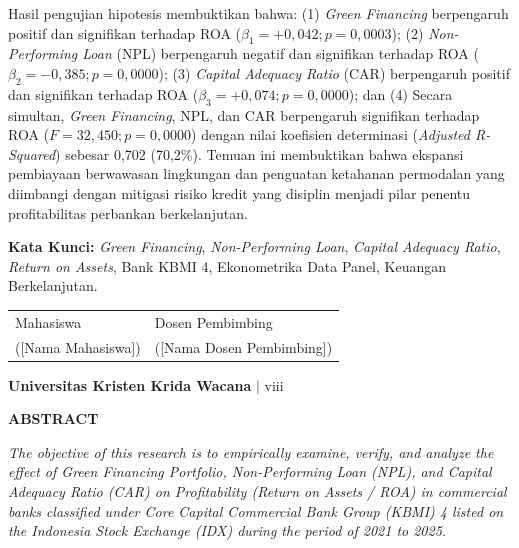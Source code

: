 \documentclass[12pt,a4paper]{article}
\newcommand{\ukrida}{Universitas Kristen Krida Wacana}
\newcommand{\nahamahasiswa}{[Nama Mahasiswa]}
\newcommand{\dosbim}{[Nama Dosen Pembimbing]}
\numberwithin{equation}{section}
\begin{document}
\noindent
Hasil pengujian hipotesis membuktikan bahwa: (1) \emph{Green Financing} berpengaruh positif dan signifikan terhadap ROA ($\beta_1 = +0{,}042; p = 0{,}0003$); (2) \emph{Non-Performing Loan} (NPL) berpengaruh negatif dan signifikan terhadap ROA ($\beta_2 = -0{,}385; p = 0{,}0000$); (3) \emph{Capital Adequacy Ratio} (CAR) berpengaruh positif dan signifikan terhadap ROA ($\beta_3 = +0{,}074; p = 0{,}0000$); dan (4) Secara simultan, \emph{Green Financing}, NPL, dan CAR berpengaruh signifikan terhadap ROA ($F = 32{,}450; p = 0{,}0000$) dengan nilai koefisien determinasi (\emph{Adjusted R-Squared}) sebesar 0,702 (70,2\%). Temuan ini membuktikan bahwa ekspansi pembiayaan berwawasan lingkungan dan penguatan ketahanan permodalan yang diimbangi dengan mitigasi risiko kredit yang disiplin menjadi pilar penentu profitabilitas perbankan berkelanjutan.

\vspace{0.4cm}
\noindent
\textbf{Kata Kunci:} \emph{Green Financing}, \emph{Non-Performing Loan}, \emph{Capital Adequacy Ratio}, \emph{Return on Assets}, Bank KBMI 4, Ekonometrika Data Panel, Keuangan Berkelanjutan.

\vspace{0.8cm}
\begin{tabular}{p{6cm} p{6cm}}
  Mahasiswa & Dosen Pembimbing \\[2.2cm]
  (\nahamahasiswa) & (\dosbim) \\
\end{tabular}

\vfill
\begin{flushright}
  \footnotesize\textbf{\ukrida} $|$ viii
\end{flushright}

\newpage
\thispagestyle{frontmatter}
\begin{center}
  {\large\bfseries ABSTRACT}
\end{center}

\vspace{0.4cm}
\noindent
\emph{The objective of this research is to empirically examine, verify, and analyze the effect of Green Financing Portfolio, Non-Performing Loan (NPL), and Capital Adequacy Ratio (CAR) on Profitability (Return on Assets / ROA) in commercial banks classified under Core Capital Commercial Bank Group (KBMI) 4 listed on the Indonesia Stock Exchange (IDX) during the period of 2021 to 2025.}
\end{document}
